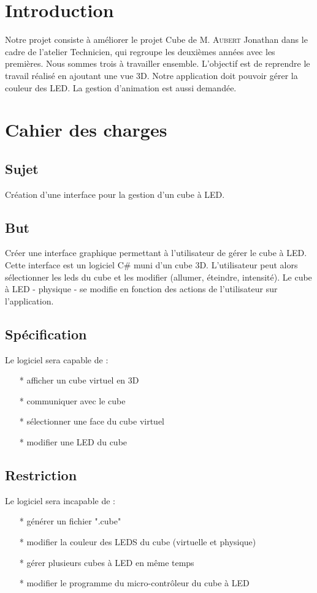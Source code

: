 \documentclass[a4paper,12pt]{article}
\begin{document}
\tableofcontents
\newpage

\section{Introduction}
Notre projet consiste à améliorer le projet Cube de M. \textsc{Aubert} Jonathan dans le cadre de l'atelier Technicien, qui regroupe les deuxièmes années avec les premières. Nous sommes trois à travailler ensemble. L'objectif est de reprendre le travail réalisé en ajoutant une vue 3D. Notre application doit pouvoir gérer la couleur des LED. La gestion d'animation est aussi demandée.
\newpage

\section{Cahier des charges}
\subsection{Sujet}
Création d'une interface pour la gestion d'un cube à LED.

\subsection{But}
Créer une interface graphique permettant à l'utilisateur de gérer le cube à LED. Cette interface est un logiciel C\# muni d'un cube 3D. L'utilisateur peut alors sélectionner les leds du cube et les modifier (allumer, éteindre, intensité). Le cube à LED - physique - se modifie en fonction des actions de l'utilisateur sur l'application.

\subsection{Spécification}
Le logiciel sera capable de :
\begin{itemize}
	\item[*] afficher un cube virtuel en 3D
	\item[*] communiquer avec le cube
	\item[*] sélectionner une face du cube virtuel
	\item[*] modifier une LED du cube
\end{itemize}

\subsection{Restriction}
Le logiciel sera incapable de :
\begin{itemize}
	\item[*] générer un fichier ".cube"
	\item[*] modifier la couleur des LEDS du cube (virtuelle et physique)
	\item[*] gérer plusieurs cubes à LED en même temps
	\item[*] modifier le programme du micro-contrôleur du cube à LED
\end{itemize}
\end{document}
